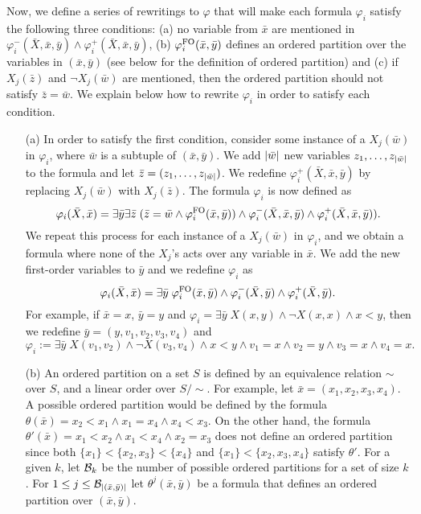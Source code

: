 Now, we define a series of rewritings to $\varphi$ that will make each formula $\varphi_i$ satisfy the following three conditions: (a) no variable from $\bar{x}$ are mentioned in $\varphi_i^{-}(\bar{X},\bar{x},\bar{y})\wedge\varphi_i^{+}(\bar{X},\bar{x},\bar{y})$, (b) $\varphi_i^{{\rm FO}}(\bar{x},\bar{y})$ defines an ordered partition over the variables in $(\bar{x},\bar{y})$ (see below for the definition of ordered partition) and (c) if $X_j(\bar{z})$ and $\neg X_j(\bar{w})$ are mentioned, then the ordered partition should not satisfy $\bar{z} = \bar{w}$.
We explain below how to rewrite $\varphi_i$ in order to satisfy each condition.
\begin{itemize}
	\item[(a)] In order to satisfy the first condition, consider some instance of a $X_j(\bar{w})$ in $\varphi_i$, where $\bar{w}$ is a subtuple of $(\bar{x},\bar{y})$. We add $\vert \bar{w} \vert$ new variables $z_1,\ldots,z_{\vert \bar{w} \vert}$ to the formula and let $\bar{z} = (z_1,\ldots,z_{\vert \bar{w} \vert})$. We redefine $\varphi_i^{+}(\bar{X},\bar{x},\bar{y})$ by replacing $X_j(\bar{w})$ with $X_j(\bar{z})$. The formula $\varphi_i$ is now defined as
	$$
	\varphi_i(\bar{X},\bar{x}) = \exists \bar{y} \exists \bar{z} \; (\bar{z} = \bar{w} \wedge \varphi_i^{{\rm FO}}(\bar{x},\bar{y})) \wedge \varphi_i^{-}(\bar{X},\bar{x},\bar{y}) \wedge \varphi_i^{+}(\bar{X},\bar{x},\bar{y})).
	$$
	We repeat this process for each instance of a $X_j(\bar{w})$ in $\varphi_i$, and we obtain a formula where none of the $X_j$'s acts over any variable in $\bar{x}$. We add the new first-order variables to $\bar{y}$ and we redefine $\varphi_i$ as
	$$
	\varphi_i(\bar{X},\bar{x}) = \exists \bar{y} \; \varphi_i^{{\rm FO}}(\bar{x},\bar{y}) \wedge \varphi_i^{-}(\bar{X},\bar{y}) \wedge \varphi_i^{+}(\bar{X},\bar{y}).
	$$
	For example, if $\bar{x} = x$, $\bar{y} = y$ and $\varphi_i = \exists \bar{y} \;  X(x,y)\wedge \neg X(x,x) \wedge x < y$, then we redefine $\bar{y} = (y,v_1,v_2,v_3,v_4)$ and $\varphi_i := \exists \bar{y} \;  X(v_1,v_2) \wedge \neg X(v_3,v_4) \wedge x < y \wedge v_1 = x \wedge v_2 = y \wedge v_3 = x \wedge v_4 = x.$ 
	\item[(b)] An ordered partition on a set $S$ is defined by an equivalence relation $\sim$ over $S$, and a linear order over $S/\!\sim$. For example, let $\bar{x} = (x_1,x_2,x_3,x_4)$. A possible ordered partition would be defined by the formula $\theta(\bar{x}) = x_2 < x_1 \wedge x_1 = x_4 \wedge x_4 < x_3$. On the other hand, the formula $\theta'(\bar{x}) = x_1 < x_2 \wedge x_1 < x_4 \wedge x_2 = x_3$ does not define an ordered partition since both $\{x_1\}<\{x_2,x_3\}<\{x_4\}$ and $\{x_1\} < \{x_2,x_3,x_4\}$ satisfy $\theta'$.
	For a given $k$, let $\mathcal{B}_k$ be the number of possible ordered partitions for a set of size $k$. For $1 \leq j \leq \mathcal{B}_{\vert (\bar{x},\bar{y}) \vert}$ 
	let $\theta^j(\bar{x},\bar{y})$ be a formula that defines an ordered partition over $(\bar{x},\bar{y})$. 
	

\end{itemize}
